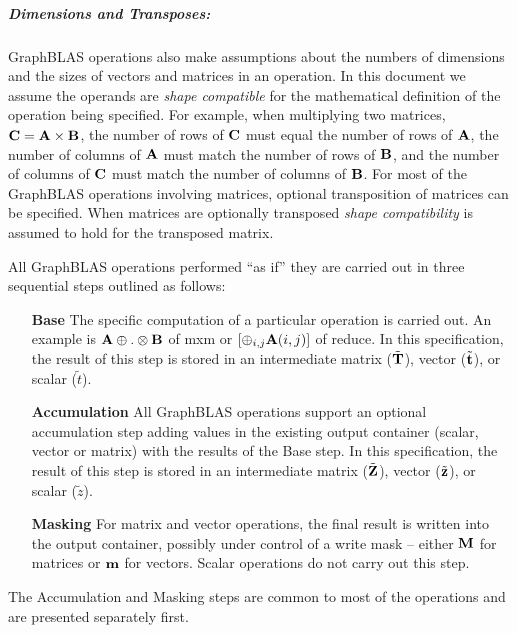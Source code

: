 \subparagraph{Dimensions and Transposes:}
GraphBLAS operations also make assumptions about the numbers of dimensions and 
the sizes of vectors and matrices in an operation.   In this document we assume the
operands are \emph{shape compatible} for the mathematical definition of the operation 
being specified.  For example, when multiplying two matrices, 
${\bf C} = {\bf A} \times {\bf B}$, the number 
of rows of ${\bf C}$ must equal the number of rows of ${\bf A}$, the number of 
columns of ${\bf A}$ must match the number of rows of ${\bf B}$, and the number 
of columns of ${\bf C}$ must match the number of columns of ${\bf B}$.   
For most of the GraphBLAS operations involving matrices, optional transposition of
matrices can be specified. When matrices are optionally transposed \emph{shape compatibility}
is assumed to hold for the transposed matrix.

All GraphBLAS operations performed ``as if'' they are carried out in three sequential 
steps outlined as follows:

\begin{enumerate}[leftmargin=1.1in]
\item[\bf Base] The specific computation of a particular operation is carried out.  
An example is ${\bf A}\oplus.\otimes{\bf B}$ of {\sf mxm} or 
$\left[\oplus_{i,j}{\bf A}(i,j) \right]$ of {\sf reduce}.  In this specification, 
the result of this step is stored in an intermediate matrix ($\tilde{{\bf T}}$), 
vector ($\tilde{{\bf t}}$), or scalar ($\tilde{t}$).

\item[\bf Accumulation] All GraphBLAS operations support an optional accumulation step 
adding values in the existing output container (scalar, vector or matrix) with the 
results of the Base step.  In this specification, the result of this step is stored in 
an intermediate matrix ($\tilde{{\bf Z}}$), vector ($\tilde{{\bf z}}$), or scalar ($\tilde{z}$).

\item[\bf Masking] For matrix and vector operations, the final result is written into 
the output container, possibly under control of a write mask -- either ${\bf M}$ for 
matrices or ${\bf m}$ for vectors.  Scalar operations do not carry out this step.
\end{enumerate}

The Accumulation and Masking steps are common to most of the operations and are presented separately first.


